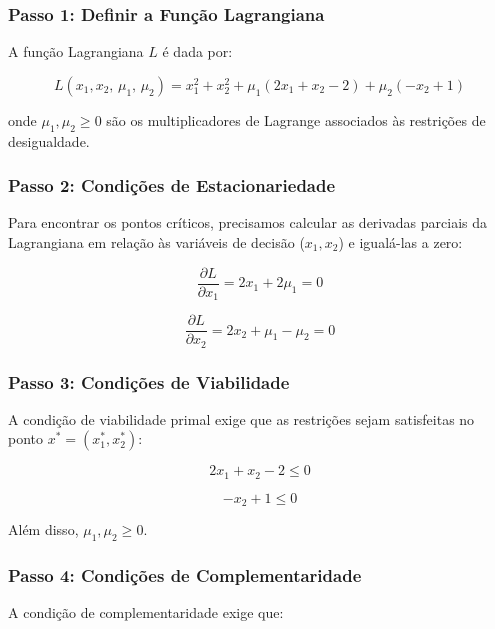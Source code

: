 \documentclass[a4paper, 12pt]{article}
\begin{document}
\subsubsection{Passo 1: Definir a Função Lagrangiana}
A função Lagrangiana $L$ é dada por:

\begin{equation*}
    L(x_1, x_2, \, \mu_1, \, \mu_2) = x_1^2 + x_2^2 + \mu_1 (2x_1 + x_2 - 2) + \mu_2 (-x_2 + 1)
\end{equation*}

onde $\mu_1, \mu_2 \geq 0$ são os multiplicadores de Lagrange associados às restrições de desigualdade.

\subsubsection{Passo 2: Condições de Estacionariedade}
Para encontrar os pontos críticos, precisamos calcular as derivadas parciais da Lagrangiana em relação às variáveis de decisão ($x_1, x_2$) e igualá-las a zero:

\begin{equation*}
    \frac{\partial L}{\partial x_1} = 2x_1 + 2\mu_1 = 0
\end{equation*}

\begin{equation*}
    \frac{\partial L}{\partial x_2} = 2x_2 + \mu_1 - \mu_2 = 0
\end{equation*}

\subsubsection{Passo 3: Condições de Viabilidade}
A condição de viabilidade primal exige que as restrições sejam satisfeitas no ponto $x^* = (x_1^*, x_2^*)$:

\begin{equation*}
    2x_1 + x_2 - 2 \leq 0
\end{equation*}

\begin{equation*}
    -x_2 + 1 \leq 0
\end{equation*}

Além disso, $\mu_1, \mu_2 \geq 0$.

\subsubsection{Passo 4: Condições de Complementaridade}
A condição de complementaridade exige que:
\end{document}
